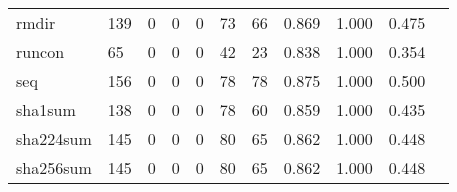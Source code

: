 \begin{longtable}{lp{1.2cm}p{1.2cm}p{1.2cm}p{1.2cm}p{1.2cm}p{1.2cm}p{1.2cm}p{1.2cm}p{1.2cm}p{1.2cm}}
rmdir     &                                   139 &                                                  0 &                                                  0 &                                                  0 &                                                 73 &                                                 66 &                                              0.869 &                                              1.000 &                                              0.475 \\
runcon    &                                    65 &                                                  0 &                                                  0 &                                                  0 &                                                 42 &                                                 23 &                                              0.838 &                                              1.000 &                                              0.354 \\
seq       &                                   156 &                                                  0 &                                                  0 &                                                  0 &                                                 78 &                                                 78 &                                              0.875 &                                              1.000 &                                              0.500 \\
sha1sum   &                                   138 &                                                  0 &                                                  0 &                                                  0 &                                                 78 &                                                 60 &                                              0.859 &                                              1.000 &                                              0.435 \\
sha224sum &                                   145 &                                                  0 &                                                  0 &                                                  0 &                                                 80 &                                                 65 &                                              0.862 &                                              1.000 &                                              0.448 \\
sha256sum &                                   145 &                                                  0 &                                                  0 &                                                  0 &                                                 80 &                                                 65 &                                              0.862 &                                              1.000 &                                              0.448 \\

\end{longtable}

